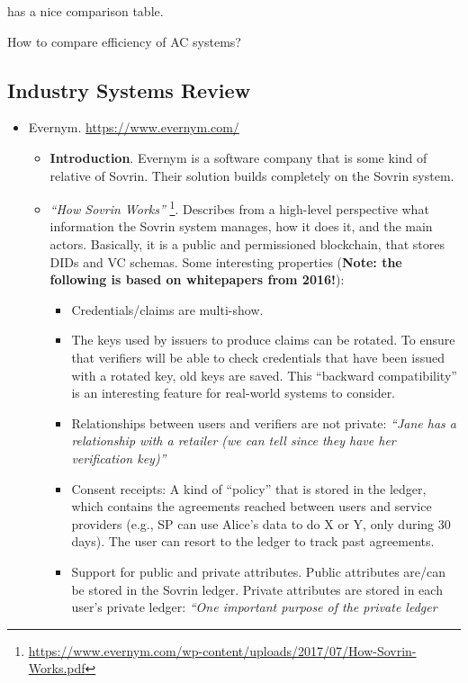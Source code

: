 \cite{fhs19} has a nice comparison table.

How to compare efficiency of AC systems?

\subsection{Industry Systems Review}

\begin{itemize}
\item Evernym. \url{https://www.evernym.com/}
  \begin{itemize}
  \item {\bf Introduction}. Evernym is a software company that is some kind of
    relative of Sovrin. Their solution builds completely on the Sovrin system.
  \item \emph{``How Sovrin Works''}%
    \footnote{\url{https://www.evernym.com/wp-content/uploads/2017/07/How-Sovrin-Works.pdf}}.
    Describes from a high-level perspective what information the Sovrin system
    manages, how it does it, and the main actors. Basically, it is a public and
    permissioned blockchain, that stores DIDs and VC schemas.
    Some interesting properties (\textbf{Note: the following is based on
      whitepapers from 2016!}):
    \begin{itemize}
    \item Credentials/claims are multi-show.
    \item The keys used by issuers to produce claims can be rotated. To ensure
      that verifiers will be able to check credentials that have been issued
      with a rotated key, old keys are saved. This ``backward compatibility''
      is an interesting feature for real-world systems to consider.      
    \item Relationships between users and verifiers are not private:
      \emph{``Jane has a relationship with a retailer (we can tell since they
        have her verification key)''}
    \item Consent receipts: A kind of ``policy'' that is stored in the ledger,
      which contains the agreements reached between users and service providers
      (e.g., SP can use Alice's data to do X or Y, only during 30 days). The
      user can resort to the ledger to track past agreements.      
    \item Support for public and private attributes. Public attributes are/can
      be stored in the Sovrin ledger. Private attributes are stored in each
      user's private ledger: \emph{``One important purpose of the private ledger
}
\end{itemize}
\end{itemize}
\end{itemize}
